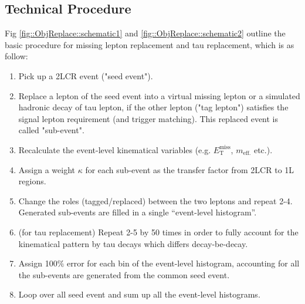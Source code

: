\subsection{Technical Procedure}
Fig \ref{fig::ObjReplace::schematic1} and \ref{fig::ObjReplace::schematic2} outline the basic procedure for missing lepton replacement and tau replacement, which is as follow:
\begin{enumerate}
\item Pick up a 2LCR event ("seed event").
\item Replace a lepton of the seed event into a virtual missing lepton or a simulated hadronic decay of tau lepton, if the other lepton ("tag lepton") satisfies the signal lepton requirement (and trigger matching). This replaced event is called "sub-event".
\item Recalculate the event-level kinematical variables (e.g. $E_{\mathrm{T}}^{\mathrm{miss}}$, $m_{\mathrm{eff.}}$ etc.).
\item Assign a weight $\kappa$ for each sub-event as the transfer factor from 2LCR to 1L regions.
\item Change the roles (tagged/replaced) between the two leptons and repeat 2-4. Generated sub-events are filled in a single ``event-level histogram''.
\item (for tau replacement) Repeat 2-5 by 50 times in order to fully account for the kinematical pattern by tau decays which differs decay-be-decay.
\item Assign 100$\%$ error for each bin of the event-level histogram, accounting for all the sub-events are generated from the common seed event.
\item Loop over all seed event and sum up all the event-level histograms.
\end{enumerate}


